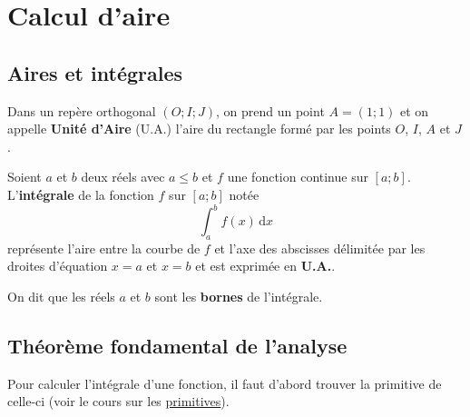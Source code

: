 






	\section{Calcul d'aire}

	\subsection{Aires et intégrales}

	Dans un repère orthogonal $(O; I; J)$, on prend un point $A = (1; 1)$ et on appelle \textbf{Unité d'Aire} (U.A.) l'aire du rectangle formé par les points $O$, $I$, $A$ et $J$.


	Soient $a$ et $b$ deux réels avec $a \leq b$ et $f$ une fonction continue sur $[a;b]$. L'\textbf{intégrale} de la fonction $f$ sur $[a;b]$ notée
	\[ \int_{a}^{b} f(x) \, \mathrm{d}x \]
	représente l'aire entre la courbe de $f$ et l'axe des abscisses délimitée par les droites d'équation $x = a$ et $x = b$
	et est exprimée en \textbf{U.A.}.


	On dit que les réels $a$ et $b$ sont les \textbf{bornes} de l'intégrale.

	\subsection{Théorème fondamental de l'analyse}

	Pour calculer l'intégrale d'une fonction, il faut d'abord trouver la primitive de celle-ci (voir le cours sur les \href{https://bacomathiqu.es/cours/terminale/primitives-equations-differentielles/}{primitives}).

